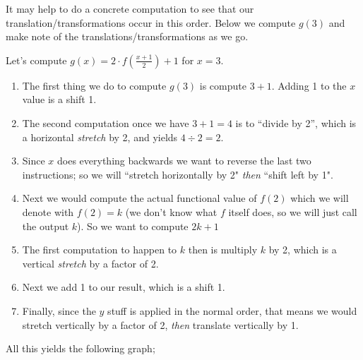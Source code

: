 \documentclass{ximera}
\begin{document}
    It may help to do a concrete computation to see that our translation/transformations occur in this order. Below we compute $g(3)$ and make note of the translations/transformations as we go.
    \begin{explanation}
        Let's compute $g(x) = 2 \cdot f\left(\frac{x+1}{2}\right) + 1$ for $x = 3$.
        \begin{enumerate}
            \item The first thing we do to compute $g(3)$ is compute $3+1$. Adding 1 to the $x$ value is a shift  1.
            \item The second computation once we have $3+1 = 4$ is to ``divide by 2'', which is a horizontal \textit{stretch} by 2, and yields $4 \div 2 = 2$.
            \item Since $x$ does everything backwards we want to reverse the last two instructions; so we will ``stretch horizontally by 2" \textit{then} ``shift left by 1".
            \item Next we would compute the actual functional value of $f(2)$ which we will denote with $f(2) = k$ (we don't know what $f$ itself does, so we will just call the output $k$). So we want to compute $2k+1$
            \item The first computation to happen to $k$ then is multiply $k$ by 2, which is a vertical \textit{stretch} by a factor of 2.
            \item Next we add 1 to our result, which is a shift  1.
            \item Finally, since the $y$ stuff is applied in the normal order, that means we would stretch vertically by a factor of 2, \textit{then} translate vertically by 1.
        \end{enumerate}
    \end{explanation}
    
    All this yields the following graph;

    \begin{center}
    \end{center}
    
\end{document}
